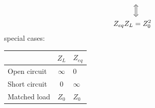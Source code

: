 \documentclass[a4paper,11pt]{article}
\begin{document}
\begin{enumerate}
\begin{align*}
			&\Big\Updownarrow \\
			Z_{eq}Z_L &= Z_0^2
		\end{align*}
		special cases: 
		\begin{center}
			\begin{tabular}{|l|c|l|}
				\hline
				& $Z_L$ &$ Z_{eq}$ \\ \hline
				Open circuit  & $\infty$ & 0 \\ \hline 
				Short circuit & $0$ & $\infty$ \\ \hline 
				Matched load  & $Z_0$ & $Z_0$\\ \hline 
			\end{tabular}
		\end{center}
	\end{enumerate}
\end{document}

